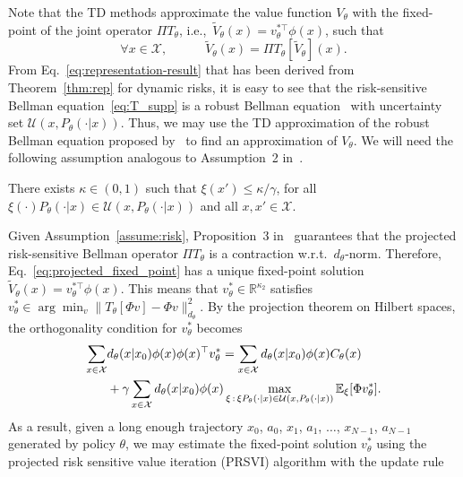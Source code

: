 Note that the TD methods approximate the value function $V_\theta$ with the fixed-point of the joint operator $\Pi T_\theta$, i.e.,~$\tilde V_\theta(x)=v_\theta^{*\top}\phi(x)$, such that
%
\begin{equation}\label{eq:projected_fixed_point}
\forall x\in\mathcal X, \quad\quad\quad \tilde V_\theta(x)=\Pi T_{\theta} [\tilde V_\theta](x).
\end{equation}
%
From Eq.~\ref{eq:representation-result} that has been derived from Theorem~\ref{thm:rep} for dynamic risks, it is easy to see that the risk-sensitive Bellman equation~\eqref{eq:T_supp} is a robust Bellman equation~\citep{nilim_robust_2005} with uncertainty set $\mathcal U(x,P_\theta(\cdot|x))$. Thus, we may use the TD approximation of the robust Bellman equation proposed by~\citet{tamar2014robust} to find an approximation of $V_\theta$.
%
We will need the following assumption analogous to Assumption~2 in~\citet{tamar2014robust}.
%
\begin{assumption}\label{assume:risk}
There exists $\kappa \in (0, 1)$ such that $\xi(x') \leq \kappa/\gamma$, for all $\xi(\cdot) P_\theta(\cdot|x) \in \mathcal U(x, P_\theta(\cdot|x))$ and all $x,x' \in\mathcal X$.
\end{assumption}
%
Given Assumption~\ref{assume:risk}, Proposition~3 in~\citet{tamar2014robust} guarantees that the projected risk-sensitive Bellman operator $\Pi T_{\theta}$ is a contraction w.r.t.~$d_{\theta}$-norm. Therefore, Eq.~\ref{eq:projected_fixed_point} has a unique fixed-point solution $\tilde V_\theta(x)=v_\theta^{*\top}\phi(x)$. This means that $v_\theta^*\in\mathbb R^{\kappa_2}$ satisfies $v_\theta^*\in\arg\min_{v}\|T_{\theta}[\Phi v]-\Phi v\|_{d_\theta}^2$. By the projection theorem on Hilbert spaces, the orthogonality condition for $v_\theta^*$ becomes
%
\begin{align*}
\sum_{x\in\mathcal X}&d_\theta(x|x_0)\phi(x)\phi(x)^\top v_\theta^*= \sum_{x\in\mathcal X} d_\theta(x|x_0)\phi(x) C_\theta(x)\\
&+\gamma \sum_{x\in\mathcal X}d_\theta(x|x_0)\phi(x)\max_{\xi\,:\,\xi P_\theta(\cdot |x) \in {\mathcal{U}}(x,P_\theta(\cdot |x))} \mathbb E_{\xi}[\Phi v_\theta^* ].
\end{align*}
%
As a result, given a long enough trajectory $x_0$, $a_0$, $x_1$, $a_1$, $\ldots$, $x_{N-1}$, $a_{N-1}$ generated by policy $\theta$, we may estimate the fixed-point solution $v^*_\theta$ using the projected risk sensitive value iteration (PRSVI) algorithm with the update rule
